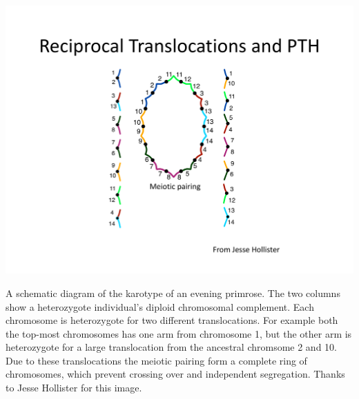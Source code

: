 \begin{marginfigure}[-3cm]
\begin{center}
  \includegraphics[width = \textwidth]{figures/Reciprocal_translocations_Hollister.pdf}
\end{center}
\caption{A schematic diagram of the karotype of an evening primrose. The two columns show a heterozygote individual's diploid chromosomal complement. Each chromosome is heterozygote for two different translocations. For example both the top-most chromosomes has one arm from chromosome 1, but the other arm is heterozygote for a large translocation from the ancestral chromsome 2 and 10. Due to these translocations the meiotic pairing form a complete ring of chromosomes, which prevent crossing over and independent segregation. Thanks to Jesse Hollister for this image. } \label{}  %
\end{marginfigure}

